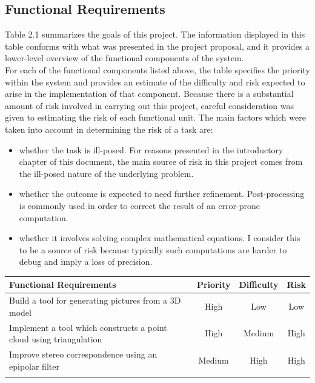 \documentclass[12pt,a4paper,twoside,openright]{report}
\begin{document}
\subsection{Functional Requirements}
\begin{samepage}
Table 2.1 summarizes the goals of this project. The information displayed in this table conforms with what was presented in the project proposal, and it provides a lower-level overview of the functional components of the system.\\
For each of the functional components listed above, the table specifies the priority within the system and provides an estimate of the difficulty and risk expected to arise in the implementation of that component. Because there is a substantial amount of risk involved in carrying out this project, careful consideration was given to estimating the risk of each functional unit. The main  factors which were taken into account in determining the risk of a task are:
\begin{itemize}
\item whether the task is ill-posed. For reasons presented in the introductory chapter of this document, the main source of risk in this project comes from the ill-posed nature of the underlying problem.
\item whether the outcome is expected to need further refinement. Post-processing is commonly used in order to correct the result of an error-prone computation.
\item whether it involves solving complex mathematical equations. I consider this to be a source of risk because typically such computations are harder to debug and imply a loss of precision.
\end{itemize}     
\begin{center}
\begin{table}
\begin{tabularx}{\textwidth}{@{} Y c c c @{}} %
\toprule
\textbf{Functional Requirements} & \textbf{Priority} & \textbf{Difficulty} & \textbf{Risk}\\ \hline
\midrule
Build a tool for generating pictures from a 3D model                    &   High       &     Low      &   Low \\ \hline \addlinespace
Implement a tool which constructs a point cloud using triangulation   &   High       &     Medium      &   High \\ \hline \addlinespace
Improve stereo correspondence using an epipolar filter                  &   Medium       &     High      &   High \\ \hline \addlinespace

\end{tabularx}
\end{table}
\end{center}
\end{samepage}
\end{document}
